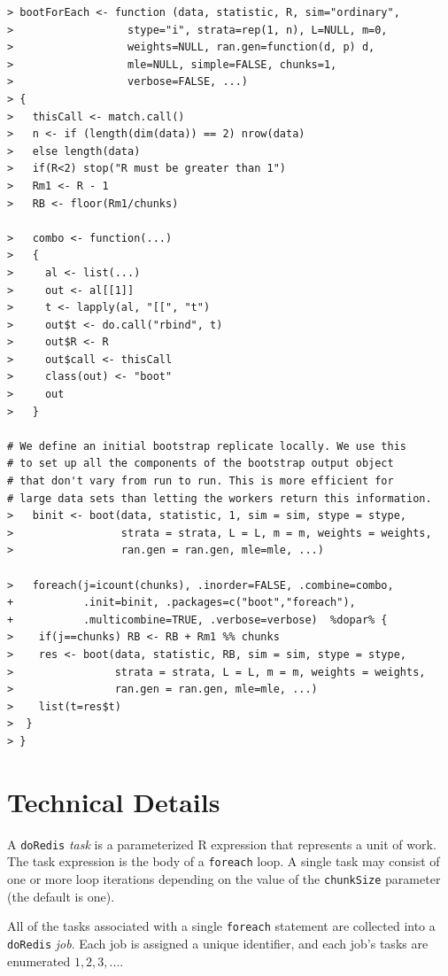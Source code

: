 \documentclass[12pt]{article}
\begin{document}
\begin{lstlisting}[float=!ht,caption=Parallel boot Function,basicstyle=\footnotesize\ttfamily,label=bootforeach]
> bootForEach <- function (data, statistic, R, sim="ordinary",
>                  stype="i", strata=rep(1, n), L=NULL, m=0,
>                  weights=NULL, ran.gen=function(d, p) d,
>                  mle=NULL, simple=FALSE, chunks=1,
>                  verbose=FALSE, ...)
> {
>   thisCall <- match.call()
>   n <- if (length(dim(data)) == 2) nrow(data)
>   else length(data)
>   if(R<2) stop("R must be greater than 1")
>   Rm1 <- R - 1
>   RB <- floor(Rm1/chunks)

>   combo <- function(...)
>   {
>     al <- list(...)
>     out <- al[[1]]
>     t <- lapply(al, "[[", "t")
>     out$t <- do.call("rbind", t)
>     out$R <- R
>     out$call <- thisCall
>     class(out) <- "boot"
>     out
>   }
  
# We define an initial bootstrap replicate locally. We use this
# to set up all the components of the bootstrap output object
# that don't vary from run to run. This is more efficient for
# large data sets than letting the workers return this information.
>   binit <- boot(data, statistic, 1, sim = sim, stype = stype, 
>                 strata = strata, L = L, m = m, weights = weights,
>                 ran.gen = ran.gen, mle=mle, ...)
  
>   foreach(j=icount(chunks), .inorder=FALSE, .combine=combo,
+           .init=binit, .packages=c("boot","foreach"),
+           .multicombine=TRUE, .verbose=verbose)  %dopar% {
>    if(j==chunks) RB <- RB + Rm1 %% chunks
>    res <- boot(data, statistic, RB, sim = sim, stype = stype,
>                strata = strata, L = L, m = m, weights = weights,
>                ran.gen = ran.gen, mle=mle, ...)
>    list(t=res$t)
>  }
> }
\end{lstlisting}


\section{Technical Details}

A \verb+doRedis+ \emph{task} is a parameterized R expression that represents
a unit of work. The task expression is the body of a \verb+foreach+ loop. A
single task may consist of one or more loop iterations depending on the value
of the \verb+chunkSize+ parameter (the default is one).

All of the tasks associated with a single \verb+foreach+ statement are
collected into a \verb+doRedis+ \emph{job}. Each job is assigned a unique
identifier, and each job's tasks are enumerated $1, 2, 3, ...$.
\end{document}
